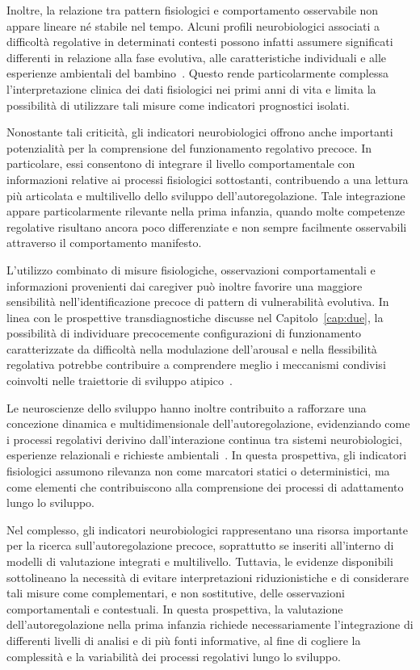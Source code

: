             Inoltre, la relazione tra pattern fisiologici e comportamento osservabile non appare lineare né stabile nel tempo. Alcuni profili neurobiologici associati a difficoltà regolative in determinati contesti possono infatti assumere significati differenti in relazione alla fase evolutiva, alle caratteristiche individuali e alle esperienze ambientali del bambino~\cite{blair2010}. Questo rende particolarmente complessa l'interpretazione clinica dei dati fisiologici nei primi anni di vita e limita la possibilità di utilizzare tali misure come indicatori prognostici isolati.

            Nonostante tali criticità, gli indicatori neurobiologici offrono anche importanti potenzialità per la comprensione del funzionamento regolativo precoce. In particolare, essi consentono di integrare il livello comportamentale con informazioni relative ai processi fisiologici sottostanti, contribuendo a una lettura più articolata e multilivello dello sviluppo dell'autoregolazione. Tale integrazione appare particolarmente rilevante nella prima infanzia, quando molte competenze regolative risultano ancora poco differenziate e non sempre facilmente osservabili attraverso il comportamento manifesto.

            L'utilizzo combinato di misure fisiologiche, osservazioni comportamentali e informazioni provenienti dai caregiver può inoltre favorire una maggiore sensibilità nell'identificazione precoce di pattern di vulnerabilità evolutiva. In linea con le prospettive transdiagnostiche discusse nel Capitolo~\ref{cap:due}, la possibilità di individuare precocemente configurazioni di funzionamento caratterizzate da difficoltà nella modulazione dell'arousal e nella flessibilità regolativa potrebbe contribuire a comprendere meglio i meccanismi condivisi coinvolti nelle traiettorie di sviluppo atipico~\cite{beauchaine2019,astle2022}.

            Le neuroscienze dello sviluppo hanno inoltre contribuito a rafforzare una concezione dinamica e multidimensionale dell'autoregolazione, evidenziando come i processi regolativi derivino dall'interazione continua tra sistemi neurobiologici, esperienze relazionali e richieste ambientali~\cite{blair2022}. In questa prospettiva, gli indicatori fisiologici assumono rilevanza non come marcatori statici o deterministici, ma come elementi che contribuiscono alla comprensione dei processi di adattamento lungo lo sviluppo.

            Nel complesso, gli indicatori neurobiologici rappresentano una risorsa importante per la ricerca sull'autoregolazione precoce, soprattutto se inseriti all'interno di modelli di valutazione integrati e multilivello. Tuttavia, le evidenze disponibili sottolineano la necessità di evitare interpretazioni riduzionistiche e di considerare tali misure come complementari, e non sostitutive, delle osservazioni comportamentali e contestuali. In questa prospettiva, la valutazione dell'autoregolazione nella prima infanzia richiede necessariamente l'integrazione di differenti livelli di analisi e di più fonti informative, al fine di cogliere la complessità e la variabilità dei processi regolativi lungo lo sviluppo.

